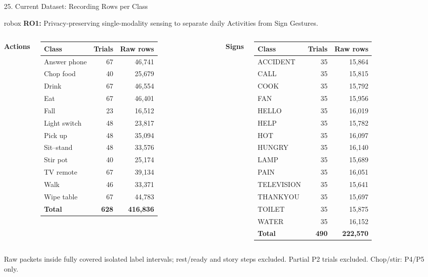\documentclass[aspectratio=169,11pt,xcolor=table]{beamer}
\newcommand{\ROoneSent}{Privacy-preserving single-modality sensing to separate daily Activities from Sign Gestures.}
\newcommand{\robox}[1]{%
    \vspace{-0.12cm}%
    \begin{beamercolorbox}[
        wd=0.965\textwidth,
        sep=4pt,
        rounded=true
    ]{robox}
        \scriptsize #1
    \end{beamercolorbox}%
    \vspace{0.10cm}%
}
\newcommand{\roone}{\robox{\textbf{RO1:} \ROoneSent}}
\newcommand{\implnote}[1]{{\scriptsize\color{AmritaDark}#1\par}}
\begin{document}
\begin{frame}{25. Current Dataset: Recording Rows per Class}
\roone
\begin{columns}[T,onlytextwidth]
{\small\textbf{\color{AmritaMaroon}Actions}}\\[4pt]
\fontsize{7}{8.1}\selectfont\renewcommand{\arraystretch}{0.94}
\begin{tabular}{@{}lrr@{}}\toprule
\textbf{Class} & \textbf{Trials} & \textbf{Raw rows}\\\midrule
Answer phone & 67 & 46,741\\
Chop food & 40 & 25,679\\
Drink & 67 & 46,554\\
Eat & 67 & 46,401\\
Fall & 23 & 16,512\\
Light switch & 48 & 23,817\\
Pick up & 48 & 35,094\\
Sit--stand & 48 & 33,576\\
Stir pot & 40 & 25,174\\
TV remote & 67 & 39,134\\
Walk & 46 & 33,371\\
Wipe table & 67 & 44,783\\
\midrule\textbf{Total} & \textbf{628} & \textbf{416,836}\\
\bottomrule\end{tabular}
{\small\textbf{\color{AmritaMaroon}Signs}}\\[4pt]
\fontsize{7}{8.1}\selectfont\renewcommand{\arraystretch}{0.94}
\begin{tabular}{@{}lrr@{}}\toprule
\textbf{Class} & \textbf{Trials} & \textbf{Raw rows}\\\midrule
ACCIDENT & 35 & 15,864\\
CALL & 35 & 15,815\\
COOK & 35 & 15,792\\
FAN & 35 & 15,956\\
HELLO & 35 & 16,019\\
HELP & 35 & 15,782\\
HOT & 35 & 16,097\\
HUNGRY & 35 & 16,140\\
LAMP & 35 & 15,689\\
PAIN & 35 & 16,051\\
TELEVISION & 35 & 15,641\\
THANKYOU & 35 & 15,697\\
TOILET & 35 & 15,875\\
WATER & 35 & 16,152\\
\midrule\textbf{Total} & \textbf{490} & \textbf{222,570}\\
\bottomrule\end{tabular}
\end{columns}
\vspace{0.10cm}
\implnote{Raw packets inside fully covered isolated label intervals; rest/ready and story steps excluded.
Partial P2 trials excluded. Chop/stir: P4/P5 only.}
\end{frame}
\end{document}
